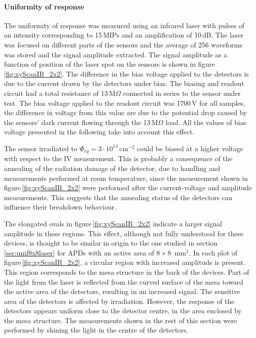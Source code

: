 \documentclass[review,number,sort&compress]{elsarticle}
\begin{document}
\paragraph{Uniformity of response}
The uniformity of response was measured using an infrared laser with pulses of an intensity corresponding to 15\,MIPs and an amplification of 10\,dB.
The laser was focused on different parts of the sensors and the average of 256 waveforms was stored and the signal amplitude extracted.
The signal amplitude as a function of position of the laser spot on the sensors is shown in figure\,\ref{fig:xyScanIR_2x2}.
The difference in the bias voltage applied to the detectors is due to the current drawn by the detectors under bias.
The biasing and readout circuit had a total resistance of 13\,M$\Omega$ connected in series to the sensor under test.
The bias voltage applied to the readout circuit was 1700\,V for all samples, the difference in voltage from this value are due to the potential drop caused by the sensors' dark current flowing through the 13\,M$\Omega$ load.
All the values of bias voltage presented in the following take into account this effect.

The sensor irradiated to $\Phi_{eq} = 3 \cdot 10^{14}$\,cm$^{-2}$ could be biased at a higher voltage with respect to the IV measurement.
This is probably a consequence of the annealing of the radiation damage of the detector, due to handling and measurements performed at room temperature, since the measurement shown in figure\,\ref{fig:xyScanIR_2x2} were performed after the current-voltage and amplitude measurements.
This suggests that the annealing status of the detectors can influence their breakdown behaviour.

The elongated ovals in figure\,\ref{fig:xyScanIR_2x2} indicate a larger signal amplitude in these regions.
This effect, although not fully understood for these devices, is thought to be similar in origin to the one studied in section\,\ref{sec:unif8x8laser} for APDs with an active area of $8 \times 8$~mm$^2$.
In each plot of figure\,\ref{fig:xyScanIR_2x2}, a circular region with increased amplitude is present.
This region corresponds to the mesa structure in the back of the devices.
Part of the light from the laser is reflected from the curved surface of the mesa toward the active area of the detectors, resulting in an increased signal.
The sensitive area of the detectors is affected by irradiation.
However, the response of the detectors appears uniform close to the detector centre, in the area enclosed by the mesa structure.
The measurements shown in the rest of this section were performed by shining the light in the centre of the detectors.
\end{document}
